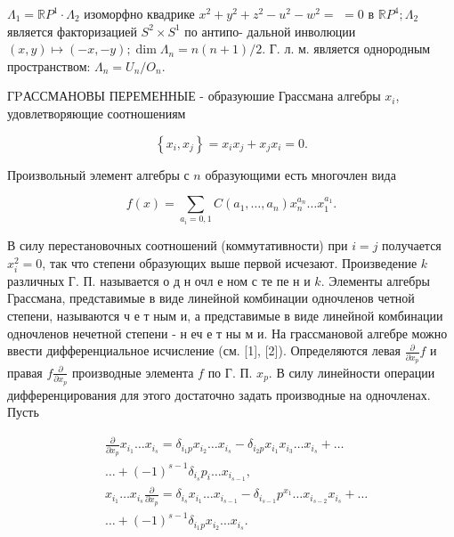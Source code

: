 \documentclass[10pt]{article}
\begin{document}
$\Lambda_{1}=\mathbb{R} P^{1} \cdot \Lambda_{2}$ изоморфно квадрике $x^{2}+y^{2}+z^{2}-u^{2}-w^{2}=$ $=0$ в $\mathbb{R} P^{4} ; \Lambda_{2}$ является факторизацией $S^{2} \times S^{1}$ по антипо- дальной инволюции $(x, y) \mapsto(-x,-y) ; \operatorname{dim} \Lambda_{n}=n(n+1) / 2$. Г. л. м. является однородным пространством: $\Lambda_{n}=U_{n} / O_{n}$.



ГPАССМАНОВЫ ПЕРЕМЕННЫЕ - образуюшие Грассмана алгебры $x_{i}$, удовлетворяющие соотношениям



\[

\left\{x_{i}, x_{j}\right\}=x_{i} x_{j}+x_{j} x_{i}=0 .

\]



Произвольный элемент алгебры с $n$ образующими есть многочлен вида



\[

f(x)=\sum_{a_{i}=0,1} C\left(a_{1}, \ldots, a_{n}\right) x_{n}^{a_{n}} \ldots x_{1}^{a_{1}} .

\]



В силу перестановочных соотношений (коммутативности) при $i=j$ получается $x_{i}^{2}=0$, так что степени образующих выше первой исчезают. Произведение $k$ различных Г. П. называется о д н очл е ном с те пе н и $k$. Элементы алгебры Грассмана, представимые в виде линейной комбинации одночленов четной степени, называются ч е т ным и, а представимые в виде линейной комбинации одночленов нечетной степени - н еч е т ны м и. На грассмановой алгебре можно ввести дифференциальное исчисление (см. [1], [2]). Определяются левая $\frac{\partial}{\partial x_{p}} f$ и правая $f \frac{\partial}{\partial x_{p}}$ производные элемента $f$ по Г. П. $x_{p}$. В силу линейности операции дифференцирования для этого достаточно задать производные на одночленах. Пусть



\[

\begin{aligned}

& \frac{\partial}{\partial x_{p}} x_{i_{1}} \ldots x_{i_{s}}=\delta_{i_{1} p} x_{i_{2}} \ldots x_{i_{s}}-\delta_{i_{2} p} x_{i_{1}} x_{i_{3}} \ldots x_{i_{s}}+\ldots \\

& \ldots+(-1)^{s-1} \delta_{i_{s}} p_{i} \ldots x_{i_{s-1}}, \\

& x_{i_{1}} \ldots x_{i_{s}} \frac{\partial}{\partial x_{p}}=\delta_{i_{s}} x_{i_{1}} \ldots x_{i_{s-1}}-\delta_{i_{s-1}} p^{x_{1}} \ldots x_{i_{s-2}} x_{i_{s}}+\ldots \\

& \ldots+(-1)^{s-1} \delta_{i_{1} p} x_{i_{2}} \ldots x_{i_{s}} .

\end{aligned}

\]
\end{document}
